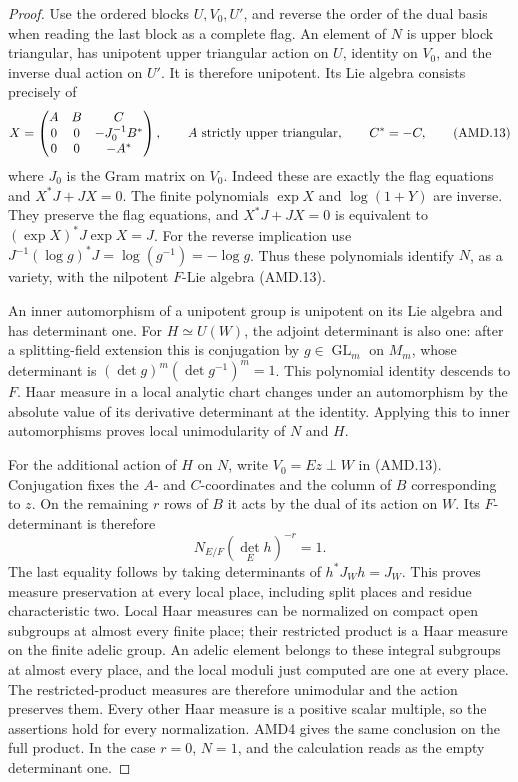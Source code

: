 \begin{proof}
Use the ordered blocks \(U,V_0,U'\), and reverse the order
of the dual basis when reading the last block as a complete
flag.  An element of \(N\) is upper block triangular, has
unipotent upper triangular action on \(U\), identity on
\(V_0\), and the inverse dual action on \(U'\).  It is
therefore unipotent.  Its Lie algebra consists precisely of
\[
 X=\begin{pmatrix}
 A&B&C\\0&0&-J_0^{-1}B^*\\0&0&-A^*
 \end{pmatrix},
 \qquad A\hbox{ strictly upper triangular},\qquad C^*=-C,
 \tag{AMD.13}
\]
where \(J_0\) is the Gram matrix on \(V_0\).  Indeed these
are exactly the flag equations and \(X^*J+JX=0\).
The finite polynomials \(\exp X\) and \(\log(1+Y)\) are
inverse.  They preserve the flag equations, and
\(X^*J+JX=0\) is equivalent to \((\exp X)^*J\exp X=J\).
For the reverse implication use
\(J^{-1}(\log g)^*J=\log(g^{-1})=-\log g\).
Thus these polynomials identify \(N\), as a variety, with
the nilpotent \(F\)-Lie algebra (AMD.13).

An inner automorphism of a unipotent group is unipotent on its
Lie algebra and has determinant one.  For \(H\simeq U(W)\),
the adjoint determinant is also one: after a splitting-field
extension this is conjugation by \(g\in\operatorname{GL}_m\)
on \(M_m\), whose determinant is
\((\det g)^m(\det g^{-1})^m=1\).  This polynomial identity
descends to \(F\).  Haar measure in a local analytic chart
changes under an automorphism by the absolute value of its
derivative determinant at the identity.  Applying this to inner
automorphisms proves local unimodularity of \(N\) and \(H\).

For the additional action of \(H\) on \(N\), write
\(V_0=Ez\perp W\) in (AMD.13).  Conjugation fixes the
\(A\)- and \(C\)-coordinates and the column of \(B\)
corresponding to \(z\).  On the remaining \(r\) rows of
\(B\) it acts by the dual of its action on \(W\).  Its
\(F\)-determinant is therefore
\[
       N_{E/F}(\det_E h)^{-r}=1.
 \tag{AMD.14}
\]
The last equality follows by taking determinants of
\(h^*J_Wh=J_W\).  This proves measure preservation at every
local place, including split places and residue characteristic
two.  Local Haar measures can be normalized on compact open
subgroups at almost every finite place; their restricted product
is a Haar measure on the finite adelic group.  An adelic element
belongs to these integral subgroups at almost every place, and
the local moduli just computed are one at every place.  The
restricted-product measures are therefore unimodular and the
action preserves them.  Every other Haar measure is a positive
scalar multiple, so the assertions hold for every normalization.
AMD4 gives the same conclusion on the full product.  In the
case \(r=0\), \(N=1\), and the calculation reads as the
empty determinant one.
\end{proof}

